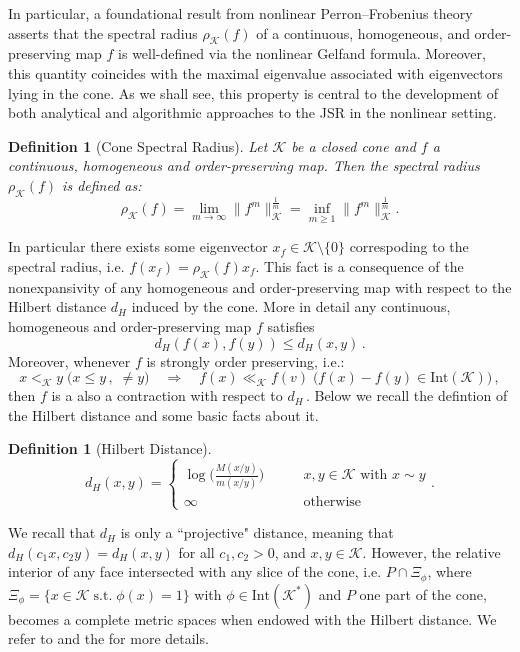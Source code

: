 \documentclass{article}
\newtheorem{definition}[theorem]{Definition}
\newcommand{\cradius}{\rho_{\cone}}
\newcommand{\cone}{\mathcal{K}}
\newcommand{\interior}{\mathrm{Int}}
\newcommand{\dist}{d_H}
\newcommand{\cl}{<_{\cone}}
\newcommand{\cll}{\ll_{\cone}}
\begin{document}
In particular, a foundational result from nonlinear Perron–Frobenius theory asserts that the spectral radius $\cradius(f)$ of a continuous, homogeneous, and order-preserving map $f$ is well-defined via the nonlinear Gelfand formula. Moreover, this quantity coincides with the maximal eigenvalue associated with eigenvectors lying in the cone. As we shall see, this property is central to the development of both analytical and algorithmic approaches to the JSR in the nonlinear setting.
%
%
%
%
\begin{definition}[Cone Spectral Radius]\label{Def_bonsall_spectral_radius}
Let $\cone$ be a closed cone and $f$ a continuous, homogeneous and order-preserving map. Then the spectral radius $\cradius(f)$ is defined as:
   \begin{equation}
   \cradius(f)=\lim_{m\rightarrow\infty}\|f^m\|_{\cone}^{\frac{1}{m}}=\inf_{m\geq 1}\|f^m\|_{\cone}^{\frac{1}{m}}.
   \end{equation} 
\end{definition}
%
In particular there exists some eigenvector $x_f\in\cone\setminus\{0\}$ correspoding to the spectral radius, i.e. $f(x_f)=\cradius(f) x_f$.
This fact is a consequence of the nonexpansivity of any homogeneous and order-preserving map with respect to the Hilbert distance $\dist$ induced by the cone. More in detail any continuous, homogeneous and order-preserving map $f$ satisfies
\begin{equation}
    \dist(f(x),f(y))\leq \dist(x,y)\,.
\end{equation}
Moreover, whenever $f$ is strongly order preserving, i.e.:
\begin{equation}
    x\cl y \;\big(x\leq y \,,\; \neq y\big) \quad \Rightarrow \quad f(x)\cll f(v)\; \big(f(x)-f(y)\in \interior(\cone)\big)\,,
\end{equation}
then $f$ is a also a contraction with respect to $\dist$\,.
Below we recall the defintion of the Hilbert distance and some basic facts about it.
%
\begin{definition}[Hilbert Distance]
\begin{equation}
\dist(x,y)=\begin{cases}
    \log\bigg(\frac{M(x/y)}{m(x/y)}\bigg)\qquad &x,y\in \cone \text{ with } x\sim y\\
\infty \qquad &\text{otherwise}
\end{cases}.    
\end{equation}
\end{definition}
%
We recall that $\dist$ is only a “projective" distance, meaning that $\dist(c_1x,c_2 y)=d_{H}(x,y)$ for all $c_1,c_2>0$, and $x,y\in\cone$.
%
However, the relative interior of any face intersected with any slice of the cone, i.e. $P\cap \Xi_\phi$, where $\Xi_\phi=\{x\in\cone \;\text{s.t.}\; \phi(x)=1\}$ with $\phi\in \interior(\cone^*)$ and $P$ one part of the cone, becomes a complete metric spaces when endowed with the Hilbert distance. We refer to \cite{lemmens2012nonlinear} and the  for more details.
\end{document}
